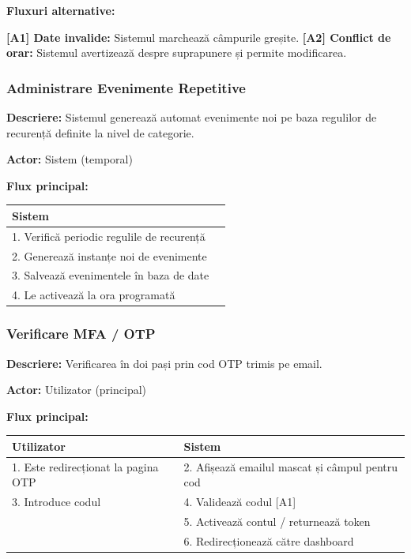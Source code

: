 \documentclass[11pt]{article}
\begin{document}
\textbf{Fluxuri alternative:}

\textbf{[A1] Date invalide:} Sistemul marchează câmpurile greșite.  \newline
\textbf{[A2] Conflict de orar:} Sistemul avertizează despre suprapunere și permite modificarea.



\subsubsection{Administrare Evenimente Repetitive}


\textbf{Descriere:} Sistemul generează automat evenimente noi pe baza regulilor de recurență definite la nivel de categorie.

\textbf{Actor:} Sistem (temporal)

\textbf{Flux principal:}

\begin{tabular}{l l}
\hline
\textbf{Sistem} \\
\hline
1. Verifică periodic regulile de recurență \\
2. Generează instanțe noi de evenimente \\
3. Salvează evenimentele în baza de date \\
4. Le activează la ora programată \\
\hline
\end{tabular}

\subsubsection{Verificare MFA / OTP}


\textbf{Descriere:} Verificarea în doi pași prin cod OTP trimis pe email.

\textbf{Actor:} Utilizator (principal)

\textbf{Flux principal:}

\begin{tabular}{l l}
\hline
\textbf{Utilizator} & \textbf{Sistem} \\
\hline
1. Este redirecționat la pagina OTP & 2. Afișează emailul mascat și câmpul pentru cod \\
3. Introduce codul & 4. Validează codul [A1] \\
 & 5. Activează contul / returnează token \\
 & 6. Redirecționează către dashboard \\
\hline
\end{tabular}
\end{document}
